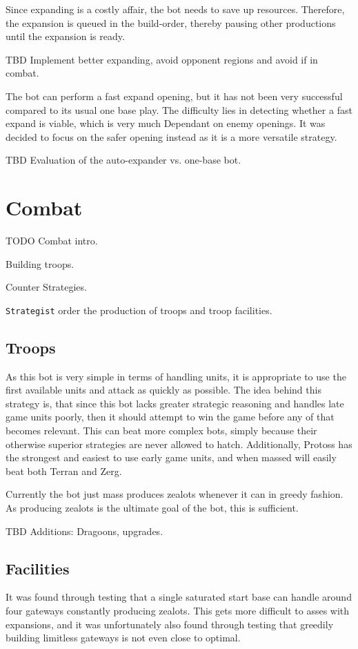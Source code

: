 		Since expanding is a costly affair, the bot needs to save up resources. Therefore, the expansion is queued in the build-order, thereby pausing other productions until the expansion is ready.
		
		TBD Implement better expanding, avoid opponent regions and avoid if in combat.
	
		The bot can perform a fast expand opening, but it has not been very successful compared to its usual one base play. The difficulty lies in detecting whether a fast expand is viable, which is very much Dependant on enemy openings. It was decided to focus on the safer opening instead as it is a more versatile strategy.
		
		TBD Evaluation of the auto-expander vs. one-base bot.
		
\section{Combat}
TODO Combat intro.

Building troops.

Counter Strategies.

\texttt{Strategist} order the production of troops and troop facilities.

	\subsection*{Troops}
	As this bot is very simple in terms of handling units, it is appropriate to use the first available units and attack as quickly as possible. The idea behind this strategy is, that since this bot lacks greater strategic reasoning and handles late game units poorly, then it should attempt to win the game before any of that becomes relevant. This can beat more complex bots, simply because their otherwise superior strategies are never allowed to hatch. Additionally, Protoss has the strongest and easiest to use early game units, and when massed will easily beat both Terran and Zerg.

	Currently the bot just mass produces zealots whenever it can in greedy fashion. As producing zealots is the ultimate goal of the bot, this is sufficient.

	TBD Additions: Dragoons, upgrades.
	
	\subsection*{Facilities}
	It was found through testing that a single saturated start base can handle around four gateways constantly producing zealots. This gets more difficult to asses with expansions, and it was unfortunately also found through testing that greedily building limitless gateways is not even close to optimal.
	
